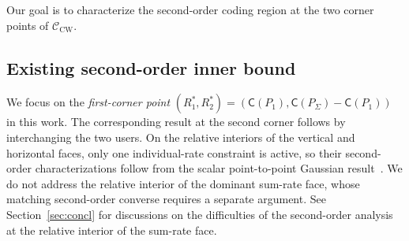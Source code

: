 \documentclass[11pt,onecolumn]{IEEEtran}
\newcommand{\calC}{\mathcal{C}}
\newcommand{\rvC}{\mathsf{C}}
\begin{document}
Our goal is to characterize the second-order coding region at the two
corner points of $\calC_{\mathrm{CW}}$.


\subsection{Existing second-order inner bound}
We focus on the {\em first-corner point}
$(R_1^*,R_2^*)=(\rvC(P_1),\rvC(P_\Sigma)-\rvC(P_1) )$
in this work.
The corresponding result at the second corner follows by interchanging
the two users. On the relative interiors of the vertical and horizontal
faces, only one individual-rate constraint is active, so their
second-order characterizations follow from the scalar point-to-point
Gaussian result~\cite{Hayashi09,PPV10}. We do not address the relative interior of the dominant
sum-rate face, whose matching second-order converse requires a separate
argument. See Section~\ref{sec:concl} for discussions on the difficulties of the second-order analysis at the relative interior of the sum-rate face.
\end{document}
